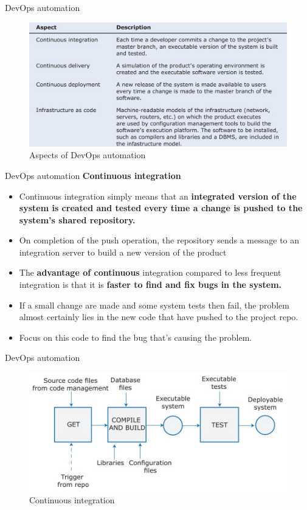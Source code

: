 \documentclass{beamer}
\begin{document}
\begin{frame}{DevOps automation}
	\begin{figure}
		\includegraphics[scale=.5]{img/m3_41}
		\caption{Aspects of DevOps automation}
	\end{figure}
\end{frame}
\begin{frame}{DevOps automation}
	\textbf{Continuous integration}
	\begin{itemize}
		\item Continuous integration simply means that an \textbf{integrated version of the system is created and tested every time a change is pushed to the system’s shared repository. }
		\item On completion of the push operation, the repository sends a message to an integration server to build a new version of the product
		\item The \textbf{advantage of continuous} integration compared to less frequent integration is that it is\textbf{ faster to find and fix bugs in the system. }
		\item If a small change  are made and some system tests then fail, the problem almost certainly lies in the new code that  have pushed to the project repo. 
		\item Focus on this code to find the bug that’s causing the problem. 
		
	\end{itemize}
\end{frame}
\begin{frame}{DevOps automation}
	\begin{figure}
		\includegraphics[scale=.5]{img/m3_42}
		\caption{Continuous integration}
	\end{figure}
\end{frame}
\end{document}

